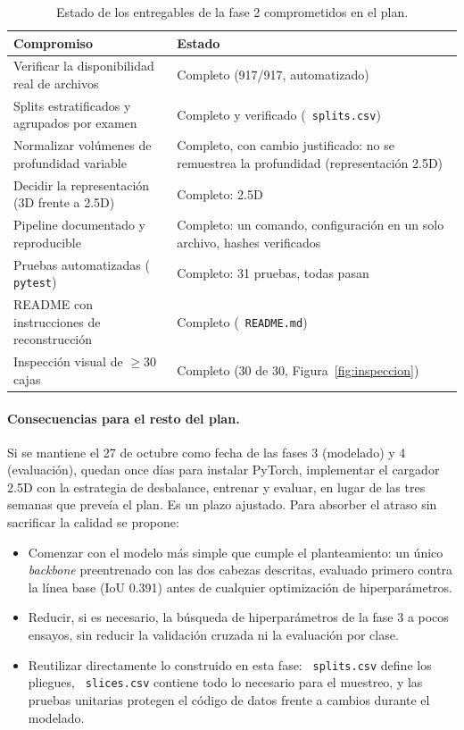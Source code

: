 \documentclass[12pt,letterpaper]{article}
\newcommand{\code}[1]{\texttt{\hyphenchar\font=-1 #1}}
\begin{document}
\begin{table}[!htbp]
\centering
\small
\caption{Estado de los entregables de la fase 2 comprometidos en el plan.}
\label{tab:avance}
\begin{tabular}{p{7.2cm}p{7.0cm}}
\toprule
Compromiso & Estado \\
\midrule
Verificar la disponibilidad real de archivos & Completo (917/917, automatizado) \\
Splits estratificados y agrupados por examen & Completo y verificado (\code{splits.csv}) \\
Normalizar volúmenes de profundidad variable & Completo, con cambio justificado: no se remuestrea la profundidad (representación 2.5D) \\
Decidir la representación (3D frente a 2.5D) & Completo: 2.5D \\
Pipeline documentado y reproducible & Completo: un comando, configuración en un solo archivo, hashes verificados \\
Pruebas automatizadas (\code{pytest}) & Completo: 31 pruebas, todas pasan \\
README con instrucciones de reconstrucción & Completo (\code{README.md}) \\
Inspección visual de $\geq$30 cajas & Completo (30 de 30, Figura~\ref{fig:inspeccion}) \\
\bottomrule
\end{tabular}
\end{table}

\paragraph{Consecuencias para el resto del plan.} Si se mantiene el 27 de octubre como fecha de las fases 3 (modelado) y 4 (evaluación), quedan once días para instalar PyTorch, implementar el cargador 2.5D con la estrategia de desbalance, entrenar y evaluar, en lugar de las tres semanas que preveía el plan. Es un plazo ajustado. Para absorber el atraso sin sacrificar la calidad se propone:

\begin{itemize}[leftmargin=*]
  \item Comenzar con el modelo más simple que cumple el planteamiento: un único \emph{backbone} preentrenado con las dos cabezas descritas, evaluado primero contra la línea base (IoU 0.391) antes de cualquier optimización de hiperparámetros.
  \item Reducir, si es necesario, la búsqueda de hiperparámetros de la fase 3 a pocos ensayos, sin reducir la validación cruzada ni la evaluación por clase.
  \item Reutilizar directamente lo construido en esta fase: \code{splits.csv} define los pliegues, \code{slices.csv} contiene todo lo necesario para el muestreo, y las pruebas unitarias protegen el código de datos frente a cambios durante el modelado.
\end{itemize}
\end{document}
